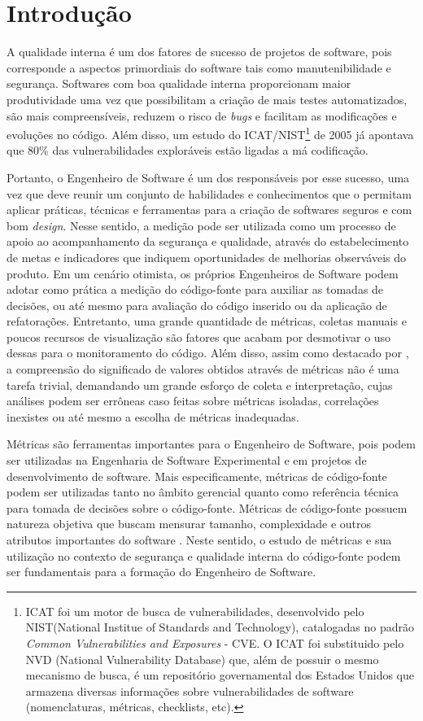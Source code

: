 \section{Introdução}
\label{introduction}

A qualidade interna é um dos fatores de sucesso de projetos de software, pois corresponde a aspectos primordiais do software tais como manutenibilidade e segurança. Softwares com boa qualidade interna proporcionam maior produtividade uma vez que possibilitam a criação de mais testes automatizados, são mais compreensíveis, reduzem o risco de \emph{bugs} e facilitam as modificações e evoluções no código. Além disso, um estudo do ICAT/NIST\footnote{ICAT foi um motor de busca de vulnerabilidades, desenvolvido pelo NIST(National Institue of Standards and Technology), catalogadas no padrão \emph{Common Vulnerabilities and Exposures} - CVE. O ICAT foi substituido pelo NVD (National Vulnerability Database) que, além de possuir o mesmo mecanismo de busca, é um repositório governamental dos Estados Unidos que armazena diversas informações sobre vulnerabilidades de software (nomenclaturas, métricas, checklists, etc).} de 2005 já apontava que 80\% das vulnerabilidades exploráveis estão ligadas a má codificação.

Portanto, o Engenheiro de Software é um dos responsáveis por esse sucesso, uma vez que deve reunir um conjunto de habilidades e conhecimentos que o permitam aplicar práticas, técnicas e ferramentas para a criação de softwares seguros e com bom \emph{design}. Nesse sentido, a medição pode ser utilizada como um processo de apoio ao acompanhamento da segurança e qualidade, através do estabelecimento de metas e indicadores que indiquem oportunidades de melhorias observáveis do produto. Em um cenário otimista,
os próprios Engenheiros de Software podem adotar como prática a medição do código-fonte para auxiliar as tomadas de decisões, ou até mesmo para avaliação do código inserido ou da aplicação de refatorações. Entretanto, uma grande quantidade de métricas, coletas manuais e poucos recursos de visualização são fatores que acabam por desmotivar o uso dessas para o monitoramento do código. Além disso, assim como destacado por \cite{chidamber1994}, a compreensão do significado de valores obtidos através de métricas não é uma tarefa trivial, demandando um grande esforço de coleta e interpretação, cujas análises podem ser errôneas caso feitas sobre métricas isoladas, correlações inexistes ou até mesmo a escolha de métricas inadequadas.

Métricas são ferramentas importantes para o Engenheiro de Software, pois podem ser utilizadas na Engenharia de Software Experimental \cite{hegedus2012} e em projetos de desenvolvimento de software. Mais especificamente, métricas de código-fonte podem ser utilizadas tanto no âmbito gerencial quanto como referência técnica para tomada de decisões sobre o código-fonte. Métricas de código-fonte possuem natureza objetiva que buscam mensurar tamanho, complexidade e outros atributos importantes do software \cite{henry1984kafura}\cite{yau1985zweben}\cite{systa2000}. Neste sentido, o estudo de métricas e sua utilização no contexto de segurança e qualidade interna do código-fonte podem ser fundamentais para a formação do Engenheiro de Software.

